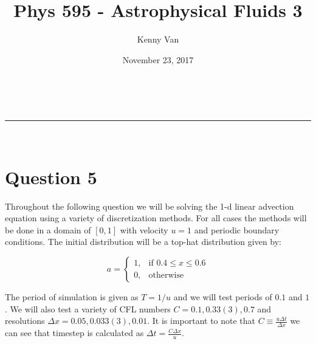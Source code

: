 \documentclass[a4paper,11pt]{article}
\makeatletter
\newcommand{\linia}{\rule{\linewidth}{0.5pt}}
\theoremstyle{mytheor}
\renewcommand{\maketitle}{
\begin{center}
\vspace{2ex}
{\huge \textsc{\@title}}
\vspace{1ex}
\\
\linia\\
\@author \hfill \@date
\vspace{4ex}
\end{center}
}
\makeatother
\begin{document}
\title{Phys 595 - Astrophysical Fluids 3}
\author{Kenny Van}
\date{November 23, 2017}


\maketitle
\section*{Question 5}

Throughout the following question we will be solving the 1-d linear advection equation using a variety of discretization methods. For all cases the methods will be done in a domain of $[0,1]$ with velocity $ u = 1$ and periodic boundary conditions. The initial distribution will be a top-hat distribution given by:

\[
    a= 
\begin{cases}
    1, & \text{if } 0.4 \leq x \leq 0.6\\
    0, & \text{otherwise}
\end{cases}
\]

The period of simulation is given as $T = 1/u$ and we will test periods of $0.1$ and $1$. We will also test a variety of CFL numbers $C = 0.1, 0.33(3), 0.7$ and resolutions $\Delta x = 0.05, 0.033(3), 0.01$. It is important to note that $C \equiv \frac{u \Delta t}{\Delta x}$ we can see that timestep is calculated as $\Delta t = \frac{C \Delta x}{u}$. 





\end{document}
